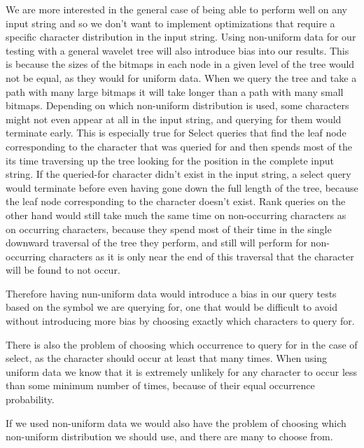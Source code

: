 We are more interested in the general case of being able to perform well on any input string and so we don't want to implement optimizations that require a specific character distribution in the input string.
Using non-uniform data for our testing with a general wavelet tree will also introduce bias into our results.
This is because the sizes of the bitmaps in each node in a given level of the tree would not be equal, as they would for uniform data.
When we query the tree and take a path with many large bitmaps it will take longer than a path with many small bitmaps.
Depending on which non-uniform distribution is used, some characters might not even appear at all in the input string, and querying for them would terminate early.
This is especially true for Select queries that find the leaf node corresponding to the character that was queried for and then spends most of the its time traversing up the tree looking for the position in the complete input string.
If the queried-for character didn't exist in the input string, a select query would terminate before even having gone down the full length of the tree, because the leaf node corresponding to the character doesn't exist.
Rank queries on the other hand would still take much the same time on non-occurring characters as on occurring characters, because they spend most of their time in the single downward traversal of the tree they perform, and still will perform for non-occurring characters as it is only near the end of this traversal that the character will be found to not occur.

Therefore having nun-uniform data would introduce a bias in our query tests based on the symbol we are querying for, one that would be difficult to avoid without introducing more bias by choosing exactly which characters to query for.

There is also the problem of choosing which occurrence to query for in the case of select, as the character should occur at least that many times.
When using uniform data we know that it is extremely unlikely for any character to occur less than some minimum number of times, because of their equal occurrence probability.

If we used non-uniform data we would also have the problem of choosing which non-uniform distribution we should use, and there are many to choose from.

